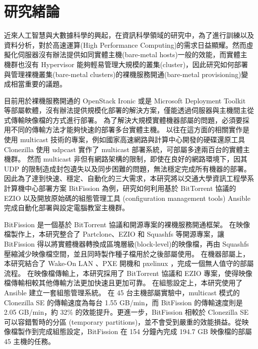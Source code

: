 \chapter{研究緒論}
\label{c:intro}
近來人工智慧與大數據科學的興起，在資訊科學領域的研究中，為了進行訓練以及資料分析，對於高速運算(High Performance Computing)的需求日益顯耀。然而虛擬化伺服器沒有辦法提供如同實體主機(bare-metal hosts)一般的效能，而實體主機群也沒有 Hypervisor 能夠輕易管理大規模的叢集(cluster)，因此研究如何部署與管理裸機叢集(bare-metal clusters)的裸機服務開通(bare-metal provisioning)變成相當重要的議題。

目前用於裸機服務開通的 OpenStack Ironic 或是 Microsoft Deployment Toolkit 等部屬軟體，沒有辦法提供規模化部署的解決方案，僅能透過伺服器與主機間主從式傳輸映像檔的方式進行部署。
為了解決大規模實體機器部屬的問題，必須要採用不同的傳輸方法才能夠快速的部署多台實體主機。
以往在這方面的相關實作是使用 multicast 技術的專案，例如國家高速網路與計算中心開發的硬碟還原工具 Clonezilla\cite{shiau2008clonezilla} 使用 udpcast 實作了 multicast 部署系統，可部屬多達兩百台的實體主機群。
然而 multicast 非但有網路架構的限制，即使在良好的網路環境下，因其 UDP 的限制造成封包遺失以及同步困難的問題，無法穩定完成所有機器的部署。
因此為了達到快速、穩定、自動化的三大需求，本研究將以交通大學資訊工程學系計算機中心部署方案 BitFission 為例，研究如何利用基於 BitTorrent 協議的 EZIO 以及開放原始碼的組態管理工具 (configuration management tools) Ansible 完成自動化部署與設定電腦教室主機群。

BitFission 是一個基於 BitTorrent 協議和開源專案的裸機服務開通框架。
在映像檔製作上，本研究整合了 Partclone、EZIO 和 Squashfs 等開源專案，讓 BitFission 得以將實體機器轉換成區塊層級(block-level)的映像檔，再由 Squashfs 壓縮減少映像檔空間，並且同時製作種子檔用於之後部屬使用。
在機器部屬上，本研究結合了 Wake-On LAN 、PXE 開機和 pxelinux ，完成一個無人值守的部屬流程。
在映像檔傳輸上，本研究採用了 BitTorrent 協議和 EZIO 專案，使得映像檔傳輸相較其他傳輸方法更加快速且更加可靠。
在組態設定上，本研究使用了 Ansible 建立一套組態管理系統。
在 45 台主機部屬實驗中，multicast 模式的 Clonezilla SE 的傳輸速度為每台 1.55 GB/min，而 BitFission 的傳輸速度則是 2.05 GB/min，約 32\% 的效能提升。更進一步，BitFission 相較於 Clonezilla SE 可以容錯暫時的分區 (temporary partitions)，並不會受到嚴重的效能損益。從映像檔製作到完成組態設定，BitFission 在 154 分鐘內完成 194.7 GB 映像檔的部屬 45 主機的任務。


